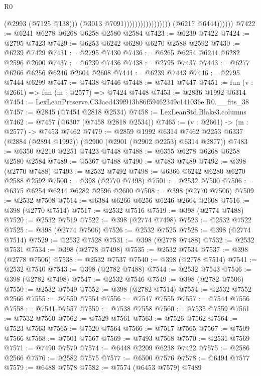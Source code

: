 \begin{lexlean}{R0}
\begin{coremodule}
                                                (@2993 (@7125 @138)))
                                              (@3013 @7091)))))))))))))))))
              (@6217 @6444))))))
@7422 := @6241 @6278 @6268 @6258 @2580 @2584
@7423 := @6239 @7422
@7424 := @2795 @7423
@7429 := @6253 @6242 @6280 @6270 @2588 @2592
@7430 := @6239 @7429
@7431 := @2795 @7430
@7436 := @6265 @6254 @6244 @6282 @2596 @2600
@7437 := @6239 @7436
@7438 := @2795 @7437
@7443 := @6277 @6266 @6256 @6246 @2604 @2608
@7444 := @6239 @7443
@7446 := @2795 @7444 @6299
@7447 := @7438 @7446
@7448 := @7431 @7447
@7451 := fun (v : @2661) => fun (m : @2577) => @7424 @7448
@7453 := @2836 @1992 @6314
@7454 := LexLeanPreserve.C33acd439f913b86f59462349c141036e.R0.__fits_38
@7457 := @2845 (@7454 @2818 @2534)
@7458 := LexLeanStd.Blake3.columns
@7462 := @7457 (@6307 (@7458 @2818 @2534))
@7465 := (v : @2661) -> (m : @2577) -> @7453 @7462
@7479 := @2859
    @1992
    @6314
    @7462
    @2253
    @6337
    (@2884 (@2894 @1992))
    (@2900 (@2901 (@2902 @2253) @6314 @2877))
@7483 := @6350 @2210 @2251 @7423 @7448
@7488 := @6355 @6278 @6268 @6258 @2580 @2584
@7489 := @5367 @7488
@7490 := @7483 @7489
@7492 := @398 (@2770 @7488)
@7493 := @2532 @7492
@7498 := @6366 @6242 @6280 @6270 @2588 @2592
@7500 := @398 (@2770 @7498)
@7501 := @2532 @7500
@7506 := @6375 @6254 @6244 @6282 @2596 @2600
@7508 := @398 (@2770 @7506)
@7509 := @2532 @7508
@7514 := @6384 @6266 @6256 @6246 @2604 @2608
@7516 := @398 (@2770 @7514)
@7517 := @2532 @7516
@7519 := @398 (@2774 @7488)
@7520 := @2532 @7519
@7522 := @398 (@2774 @7498)
@7523 := @2532 @7522
@7525 := @398 (@2774 @7506)
@7526 := @2532 @7525
@7528 := @398 (@2774 @7514)
@7529 := @2532 @7528
@7531 := @398 (@2778 @7488)
@7532 := @2532 @7531
@7534 := @398 (@2778 @7498)
@7535 := @2532 @7534
@7537 := @398 (@2778 @7506)
@7538 := @2532 @7537
@7540 := @398 (@2778 @7514)
@7541 := @2532 @7540
@7543 := @398 (@2782 @7488)
@7544 := @2532 @7543
@7546 := @398 (@2782 @7498)
@7547 := @2532 @7546
@7549 := @398 (@2782 @7506)
@7550 := @2532 @7549
@7552 := @398 (@2782 @7514)
@7554 := @2532 @7552 @2566
@7555 := @7550 @7554
@7556 := @7547 @7555
@7557 := @7544 @7556
@7558 := @7541 @7557
@7559 := @7538 @7558
@7560 := @7535 @7559
@7561 := @7532 @7560
@7562 := @7529 @7561
@7563 := @7526 @7562
@7564 := @7523 @7563
@7565 := @7520 @7564
@7566 := @7517 @7565
@7567 := @7509 @7566
@7568 := @7501 @7567
@7569 := @7493 @7568
@7570 := @2531 @7569
@7571 := @7490 @7570
@7574 := @6448 @2209 @6238 @7422
@7575 := @2586 @2566
@7576 := @2582 @7575
@7577 := @6500 @7576
@7578 := @6494 @7577
@7579 := @6488 @7578
@7582 := @7574 (@6453 @7579) @7489

\end{coremodule}
\end{lexlean}
